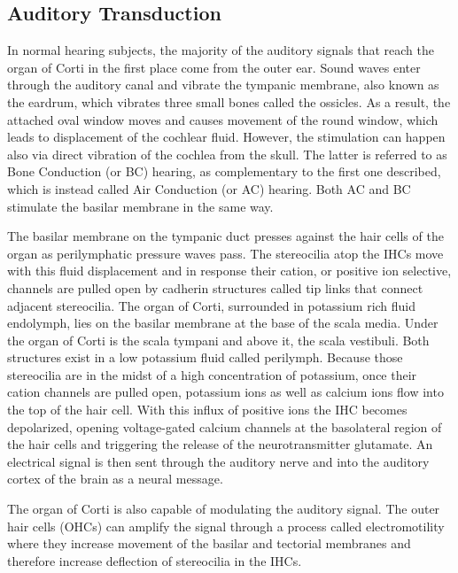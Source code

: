 \documentclass[]{book}
\begin{document}
\hypertarget{auditory-transduction}{%
\subsection{Auditory Transduction}\label{auditory-transduction}}

In normal hearing subjects, the majority of the auditory signals that reach the organ of Corti in the first place come from the outer ear. Sound waves enter through the auditory canal and vibrate the tympanic membrane, also known as the eardrum, which vibrates three small bones called the ossicles. As a result, the attached oval window moves and causes movement of the round window, which leads to displacement of the cochlear fluid. However, the stimulation can happen also via direct vibration of the cochlea from the skull. The latter is referred to as Bone Conduction (or BC) hearing, as complementary to the first one described, which is instead called Air Conduction (or AC) hearing. Both AC and BC stimulate the basilar membrane in the same way.

The basilar membrane on the tympanic duct presses against the hair cells of the organ as perilymphatic pressure waves pass. The stereocilia atop the IHCs move with this fluid displacement and in response their cation, or positive ion selective, channels are pulled open by cadherin structures called tip links that connect adjacent stereocilia. The organ of Corti, surrounded in potassium rich fluid endolymph, lies on the basilar membrane at the base of the scala media. Under the organ of Corti is the scala tympani and above it, the scala vestibuli. Both structures exist in a low potassium fluid called perilymph. Because those stereocilia are in the midst of a high concentration of potassium, once their cation channels are pulled open, potassium ions as well as calcium ions flow into the top of the hair cell. With this influx of positive ions the IHC becomes depolarized, opening voltage-gated calcium channels at the basolateral region of the hair cells and triggering the release of the neurotransmitter glutamate. An electrical signal is then sent through the auditory nerve and into the auditory cortex of the brain as a neural message.

The organ of Corti is also capable of modulating the auditory signal. The outer hair cells (OHCs) can amplify the signal through a process called electromotility where they increase movement of the basilar and tectorial membranes and therefore increase deflection of stereocilia in the IHCs.
\end{document}
